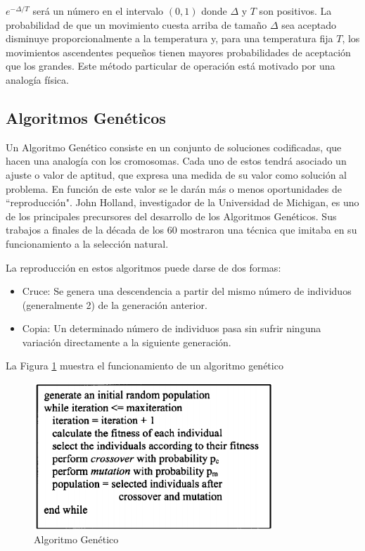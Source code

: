 \documentclass[a4paper,openright,11pt,oneside]{book}
\begin{document}
		$e ^{-\Delta / T}$ será un número en el intervalo $(0, 1)$ donde $\Delta$ y $T$ son positivos. La probabilidad de que un movimiento cuesta arriba de tamaño $\Delta$ sea aceptado disminuye proporcionalmente a la temperatura y, para una temperatura fija $T$, los movimientos ascendentes pequeños tienen mayores probabilidades de aceptación que los grandes. Este método particular de operación está motivado por una analogía física.
		
	\subsection{Algoritmos Genéticos} \label{sub:Genetico}
		Un Algoritmo Genético \cite{AlgGen} consiste en un conjunto de soluciones codificadas, que hacen una analogía con los cromosomas.  Cada uno  de  estos tendrá  asociado  un  ajuste o valor de aptitud, que expresa una medida de su valor como solución al problema. En función de este valor se le darán más o menos oportunidades de ``reproducción". John Holland, investigador de la Universidad de Michigan, es uno de los principales precursores del desarrollo de los Algoritmos Genéticos. Sus trabajos a finales de la década de los 60 mostraron una técnica que imitaba en su funcionamiento a la selección natural.
		
		La reproducción en estos algoritmos puede darse de dos formas:
		
		\begin{itemize}
			\item Cruce: Se genera una descendencia a partir del mismo número de individuos (generalmente 2) de la generación anterior. 
			\item Copia: Un determinado número de individuos pasa sin sufrir ninguna variación directamente a la siguiente generación.
		\end{itemize}
	
		La Figura \ref{AlgoritmoeGenetico} muestra el funcionamiento de un algoritmo genético
	
		\begin{figure}[h]
			\centering
			\includegraphics[width=9cm]{./Graphics/Genetic-Algorithm-pseudocode.png}
			\caption{Algoritmo Genético}
			\label{AlgoritmoeGenetico}
		\end{figure}
	
\end{document}
